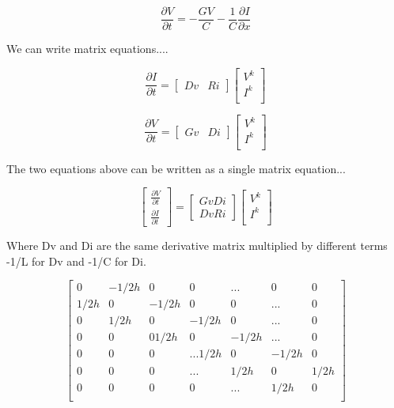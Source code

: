 \documentclass[12pt, letterpaper]{article}
\begin{document}
\begin{equation} \frac{\partial{V}}{\partial{t}} = -\frac{G V}{C} - \frac{1}{C} \frac{\partial{I}}{\partial{x}}\end{equation}




We can write matrix equations....

\begin{equation}
\frac{\partial{I}}{\partial{t}} 
=
	\begin{bmatrix}
		Dv & Ri
	\end{bmatrix}
	\begin{bmatrix}
		V^k \\
		I^k \\
	\end{bmatrix}
\end{equation}

\begin{equation}
	\frac{\partial{V}}{\partial{t}} 
	=
	\begin{bmatrix}
		Gv & Di
	\end{bmatrix}
	\begin{bmatrix}
		V^k \\
		I^k \\
	\end{bmatrix}
\end{equation}

The two equations above can be written as a single matrix equation...

\begin{equation}
    \begin{bmatrix}
    	\frac{\partial{V}}{\partial{t}} \\
    	\frac{\partial{I}}{\partial{t}} 
    \end{bmatrix}	
	=
	\begin{bmatrix}
		Gv Di \\
		Dv Ri
	\end{bmatrix}
	\begin{bmatrix}
		V^k \\
		I^k \\
	\end{bmatrix}
\end{equation}


Where Dv and Di are the same derivative matrix multiplied by different terms -1/L for Dv and -1/C for Di.

\begin{equation}
	\begin{bmatrix}
	   0 & -1/2h & 0 & 0 & ... &0 &0 \\
	   1/2h & 0 &-1/2h & 0 & 0 &... &0 \\
	   0& 1/2h & 0 &-1/2h & 0 &... &0 \\
	   0& 0& 01/2h & 0 &-1/2h & ... &0 \\
	   0& 0& 0&... 1/2h & 0 &-1/2h &0  \\
	   0& 0& 0&... & 1/2h & 0 & 1/2h  \\
	   0& 0& 0& 0&... & 1/2h & 0  \\
	\end{bmatrix}
\end{equation}
\end{document}
